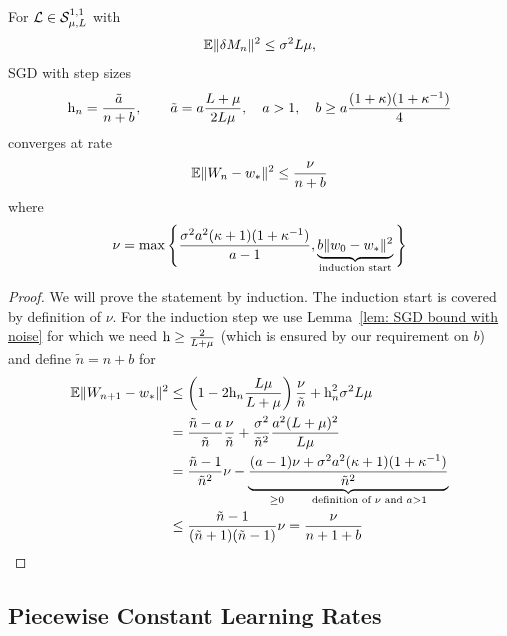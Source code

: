 \begin{theorem}
	For \(\mathcal{L}\in\mathcal{S}^{1,1}_{{\mu},{L}}\) with
	\begin{align*}
		\mathbb{E}\|\delta M_n\|^2 \le \sigma^2 L\mu,
	\end{align*}
	SGD with step sizes
	\begin{align*}
		\text{h}_n = \frac{\tilde{a}}{n+b},
		\qquad \tilde{a} =  a\frac{L+\mu}{2L\mu},
		\quad a > 1,
		\quad b \ge a\frac{(1+\kappa)(1+\kappa^{-1})}{4}
	\end{align*}
	converges at rate
	\begin{align*}
		\mathbb{E}\|W_n - w_*\|^2
		\le \frac{\nu}{n+b}
	\end{align*}
	where
	\begin{align*}
		\nu = \max\Bigg\{
			\frac{\sigma^2a^2(\kappa+1)(1+\kappa^{-1})}{a-1},
			\underbrace{
				b\|w_0 - w_*\|^2
			}_{\text{induction start}}
		\Bigg\}
	\end{align*}
\end{theorem}
\begin{proof}
	We will prove the statement by induction. The induction start is covered by
	definition of \(\nu\). For the induction step we use Lemma~\ref{lem: SGD
	bound with noise} for which we need \(\text{h} \ge \tfrac{2}{L+\mu}\)
	(which is ensured by our requirement on \(b\)) and define \(\tilde{n}=n+b\)
	for
	\begin{align*}
		\mathbb{E}\|W_{n+1}-w_*\|^2
		&\le \left(1-2\text{h}_n \frac{L\mu}{L+\mu}\right)\frac{\nu}{\tilde{n}}
		+ \text{h}_n^2 \sigma^2 L\mu\\
		&= \frac{\tilde{n} - a}{\tilde{n}}\frac{\nu}{\tilde{n}}
		+ \frac{\sigma^2}{\tilde{n}^2}\frac{a^2(L+\mu)^2}{L\mu}\\
		&= \frac{\tilde{n} - 1}{\tilde{n}^2}\nu
		- \underbrace{\frac{(a -1)\nu + \sigma^2 a^2(\kappa+1)(1+\kappa^{-1})}{\tilde{n}^2}}_{
			\ge 0\qquad \text{definition of \(\nu\) and } a>1
		}\\
		&\le \frac{\tilde{n}-1}{(\tilde{n}+1)(\tilde{n}-1)}\nu = \frac{\nu}{n+1+b}
		\qedhere
	\end{align*}
\end{proof}

\subsection{Piecewise Constant Learning Rates}

